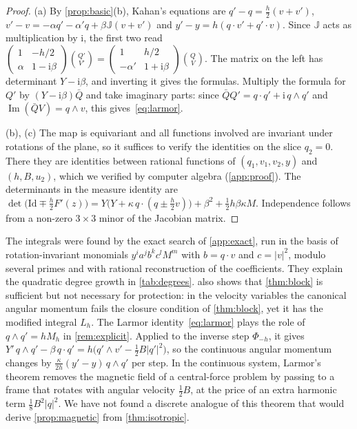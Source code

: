 \documentclass[11pt,a4paper]{article}
\theoremstyle{definition}
\theoremstyle{remark}
\newcommand{\Id}{\mathrm{Id}}
\newcommand{\Jq}{\mathbb{J}}
\begin{document}
\begin{proof}
(a) By \cref{prop:basic}(b), Kahan's equations are $q'-q=\frac h2(v+v')$,
$v'-v=-\alpha q'-\alpha'q+\beta\Jq(v+v')$ and $y'-y=h(q\cdot v'+q'\cdot v)$. Since $\Jq$ acts as multiplication
by $\mathrm i$, the first two read
$\left(\begin{smallmatrix}1&-h/2\\ \alpha&1-\mathrm i\beta\end{smallmatrix}\right)\binom{Q'}{V'}
=\left(\begin{smallmatrix}1&h/2\\-\alpha'&1+\mathrm i\beta\end{smallmatrix}\right)\binom QV$. The matrix on the
left has determinant $Y-\mathrm i\beta$, and inverting it gives the formulas. Multiply the formula for $Q'$ by
$(Y-\mathrm i\beta)\bar Q$ and take imaginary parts: since $\bar QQ'=q\cdot q'+\mathrm i\,q\wedge q'$ and
$\operatorname{Im}(\bar QV)=q\wedge v$, this gives~\eqref{eq:larmor}.

(b), (c) The map is equivariant and all functions involved are invariant under rotations of the plane, so it
suffices to verify the identities on the slice $q_2=0$. There they are identities between rational functions of
$(q_1,v_1,v_2,y)$ and $(h,B,u_2)$, which we verified by computer algebra (\cref{app:proof}). The determinants in
the measure identity are $\det\big(\Id\mp\frac h2F'(z)\big)=Y\big(Y+\kappa\,q\cdot(q\pm\frac h2v)\big)+\beta^2
+\frac12h\beta\kappa M$. Independence follows from a non-zero $3\times3$ minor of the Jacobian matrix.
\end{proof}

The integrals were found by the exact search of \cref{app:exact}, run in the basis of rotation-invariant
monomials $y^ia^jb^kc^lM^m$ with $b=q\cdot v$ and $c=\lvert v\rvert^2$, modulo several primes and with
rational reconstruction of the coefficients. They explain the quadratic degree growth in \cref{tab:degrees}.
 also shows that \cref{thm:block} is sufficient but not necessary for protection: in the
velocity variables the canonical angular momentum fails the closure condition of \cref{thm:block}, yet it has
the modified integral $L_h$. The Larmor identity~\eqref{eq:larmor} plays the role of $q\wedge q'=hM_h$ in
\cref{rem:explicit}. Applied to the inverse step $\Phi_{-h}$, it gives
$Y'\,q\wedge q'-\beta\,q\cdot q'=h\big(q'\wedge v'-\frac12B\lvert q'\rvert^2\big)$, so the continuous angular
momentum changes by $\frac{\kappa}{2h}(y'-y)\,q\wedge q'$ per step. In the continuous system, Larmor's theorem
removes the magnetic field of a central-force problem by passing to a frame that rotates with angular velocity
$\frac12B$, at the price of an extra harmonic term $\frac18B^2\lvert q\rvert^2$. We have not found a discrete
analogue of this theorem that would derive \cref{prop:magnetic} from \cref{thm:isotropic}.
\end{document}
